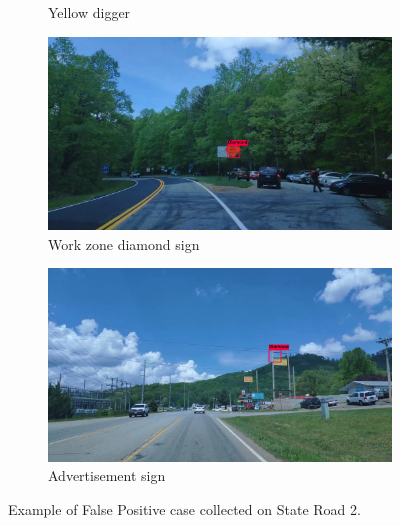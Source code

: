 \begin{figure}
\begin{center}
\begin{subfigure}[t]{.49\linewidth}
      \caption{Yellow digger}
      \label{fig:diggerFP}
    \end{subfigure}
    \begin{subfigure}[t]{.49\linewidth}
      \centering
      \includegraphics[width=0.99\linewidth]{figures/examples/sr2/FP/FP_07.png}
      \caption{Work zone diamond sign}
      \label{fig:workzoneFP}
    \end{subfigure}
    \begin{subfigure}[t]{.49\linewidth}
      \centering
      \includegraphics[width=0.99\linewidth]{figures/examples/sr2/FP/FP_17.png}
      \caption{Advertisement sign}
      \label{fig:advertisementFP}
    \end{subfigure}
    \caption{Example of False Positive case collected on State Road 2.}
    \label{fig:FPcases}
  \end{center}
\end{figure}

